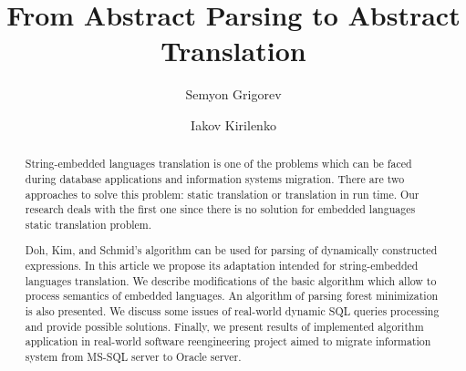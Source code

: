 \documentclass{llncs}
\begin{document}
%
%
%
%
\tableofcontents
%
\mainmatter              %
%
\title{From Abstract Parsing to Abstract Translation}
%
%
\author{Semyon Grigorev 
\and Iakov Kirilenko
}
%
%
%


\maketitle              %

\begin{abstract}

String-embedded languages translation is one of the problems which can be faced during database applications and information systems migration. There are two approaches to solve this problem: static translation or translation in run time. Our research deals with the first one since there is no solution for embedded languages static translation problem.

Doh, Kim, and Schmid's algorithm can be used for parsing of dynamically constructed expressions. In this article we propose its adaptation intended for string-embedded languages translation. We describe modifications of the basic algorithm which allow to process semantics of embedded languages. An algorithm of parsing forest minimization is also presented. We discuss some issues of real-world dynamic SQL queries processing and provide possible solutions. Finally, we present results of implemented algorithm application in real-world software reengineering project aimed to migrate information system from MS-SQL server to Oracle server.

\end{abstract}
\end{document}
